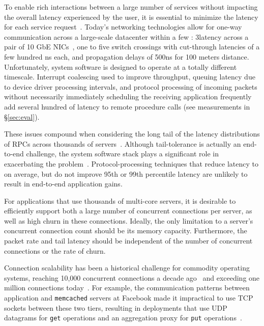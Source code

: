  To enable rich interactions
between a large number of services %
without impacting the overall latency experienced by the user, it is essential
to minimize the latency for each service
request~\cite{luiz-isscc,rumble2011s}. Today's networking technologies
allow for one-way communication across a large-scale datacenter within
a few \microsecond: 3\microsecond latency across a pair of 10 GbE
NICs~\cite{cisco-sereno}, one to five switch crossings with
cut-through latencies of a few hundred ns each, and propagation
delays of 500ns for 100 meters distance. Unfortunately, system
software is designed to operate at a totally different
timescale. Interrupt coalescing used to improve throughput, queuing
latency due to device driver processing intervals, and protocol
processing of incoming packets without necessarily immediately
scheduling the receiving application frequently add several hundred
\microsecond of latency to remote procedure calls (see measurements in
\S\ref{sec:eval}).


These issues compound when considering the long tail of the latency
distributions of RPCs across thousands of
servers~\cite{DBLP:journals/cacm/DeanB13}. Although tail-tolerance is
actually an end-to-end challenge, the system software stack plays a
significant role in exacerbating the problem~\cite{Leverich:RHSU:2014}.
Protocol-processing techniques that reduce latency to \microsecond on
average, but do not improve 95th or 99th percentile latency are
unlikely to result in end-to-end application gains.

 For applications that use thousands of
multi-core servers, it is desirable to efficiently support both a
large number of concurrent connections per server, as well as high
churn in these connections.  Ideally, the only limitation to a
server's concurrent connection count should be its memory capacity. Furthermore,
the packet rate and tail latency should be independent of the number
of concurrent connections or the rate of churn.
 
Connection scalability has been a historical challenge for commodity
operating systems, reaching 10,000 concurrent connections a decade
ago~\cite{theC10Kproblem} and exceeding one million connections
today~\cite{theC10Mproblem}.  For example, the communication patterns
between application and \texttt{memcached} servers at Facebook made it
impractical to use TCP sockets between these two tiers, resulting in
deployments that use UDP datagrams for \texttt{get} operations and an
aggregation proxy for \texttt{put}
operations~\cite{nishtala2013scaling}.

